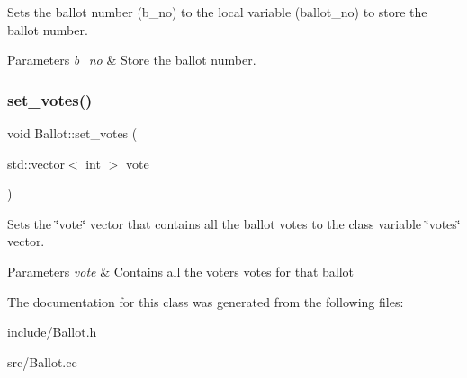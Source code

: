 Sets the ballot number (b\+\_\+no) to the local variable (ballot\+\_\+no) to store the ballot number. 


\begin{DoxyParams}{Parameters}
{\em b\+\_\+no} & Store the ballot number. \\
\hline
\end{DoxyParams}
\mbox{\label{class_ballot_ad9ea6ccae93d16136d60b5847c36c7b0}} 
\subsubsection{\texorpdfstring{set\+\_\+votes()}{set\_votes()}}
{\footnotesize\ttfamily void Ballot\+::set\+\_\+votes (\begin{DoxyParamCaption}\item[{std\+::vector$<$ int $>$}]{vote }\end{DoxyParamCaption})\hspace{0.3cm}{\ttfamily [inline]}}



Sets the \char`\"{}vote\char`\"{} vector that contains all the ballot votes to the class variable \char`\"{}votes\char`\"{} vector. 


\begin{DoxyParams}{Parameters}
{\em vote} & Contains all the voters votes for that ballot \\
\hline
\end{DoxyParams}


The documentation for this class was generated from the following files\+:\begin{DoxyCompactItemize}
\item 
include/Ballot.\+h\item 
src/Ballot.\+cc\end{DoxyCompactItemize}
